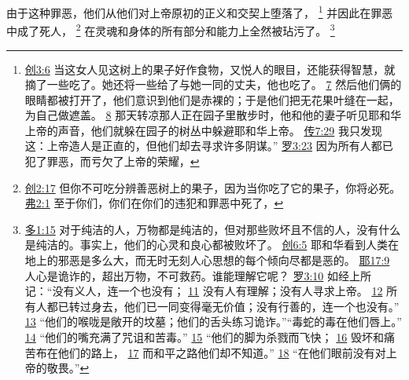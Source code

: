 \documentclass[12pt, a4paper, oneside]{ctexart}
\newcounter{parnum}[section]
\newcommand{\N}{%
   \noindent\refstepcounter{parnum}%
    \makebox[\parindent][l]{\textbf{\arabic{parnum}.}}}
\begin{document}
\N 由于这种罪恶，他们从他们对上帝原初的正义和交契上堕落了，
	\footnote {
		\href{https://biblehub.com/genesis/3-6.htm}{创3:6} 当这女人见这树上的果子好作食物，又悦人的眼目，还能获得智慧，就摘了一些吃了。她还将一些给了与她一同的丈夫，他也吃了。 
		\href{https://biblehub.com/genesis/3-7.htm}{7} 然后他们俩的眼睛都被打开了，他们意识到他们是赤裸的；于是他们把无花果叶缝在一起，为自己做遮盖。
		\href{https://biblehub.com/genesis/3-8.htm}{8} 那天转凉那人正在园子里散步时，他和他的妻子听见耶和华上帝的声音，他们就躲在园子的树丛中躲避耶和华上帝。 
		\href{https://biblehub.com/ecclesiastes/7-29.htm}{传7:29} 我只发现这：上帝造人是正直的，但他们却去寻求许多阴谋。”
		\href{https://biblehub.com/romans/3-23.htm}{罗3:23} 因为所有人都已犯了罪恶，而亏欠了上帝的荣耀，
	}
	并因此在罪恶中成了死人，
	\footnote {
		\href{https://biblehub.com/genesis/2-17.htm}{创2:17} 但你不可吃分辨善恶树上的果子，因为当你吃了它的果子，你将必死。
		\href{https://biblehub.com/ephesians/2-1.htm}{弗2:1} 至于你们，你们在你们的违犯和罪恶中死了，
	}
	在灵魂和身体的所有部分和能力上全然被玷污了。
	\footnote {
		\href{https://biblehub.com/titus/1-15.htm}{多1:15} 对于纯洁的人，万物都是纯洁的，但对那些败坏且不信的人，没有什么是纯洁的。事实上，他们的心灵和良心都被败坏了。
		\href{https://biblehub.com/genesis/6-5.htm}{创6:5} 耶和华看到人类在地上的邪恶是多么大，而无时无刻人心思想的每个倾向尽都是恶的。
		\href{https://biblehub.com/jeremiah/17-9.htm}{耶17:9} 人心是诡诈的，超出万物，不可救药。谁能理解它呢？
		\href{https://biblehub.com/romans/3-10.htm}{罗3:10} 如经上所记：“没有义人，连一个也没有；
		\href{https://biblehub.com/romans/3-11.htm}{11} 没有人有理解；没有人寻求上帝。
		\href{https://biblehub.com/romans/3-12.htm}{12} 所有人都已转过身去，他们已一同变得毫无价值；没有行善的，连一个也没有。”
		\href{https://biblehub.com/romans/3-13.htm}{13} “他们的喉咙是敞开的坟墓；他们的舌头练习诡诈。”“毒蛇的毒在他们唇上。”
		\href{https://biblehub.com/romans/3-14.htm}{14} “他们的嘴充满了咒诅和苦毒。”
		\href{https://biblehub.com/romans/3-15.htm}{15} “他们的脚为杀戮而飞快；
		\href{https://biblehub.com/romans/3-16.htm}{16} 毁坏和痛苦布在他们的路上，
		\href{https://biblehub.com/romans/3-17.htm}{17} 而和平之路他们却不知道。”
		\href{https://biblehub.com/romans/3-18.htm}{18} “在他们眼前没有对上帝的敬畏。”		
	}
\end{document}

